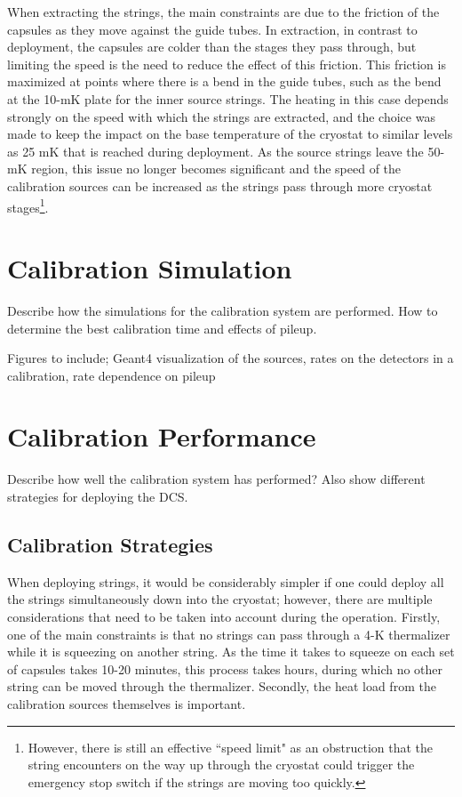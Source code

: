 When extracting the strings, the main constraints are due to the friction of the capsules as they move against the guide tubes.
In extraction, in contrast to deployment, the capsules are colder than the stages they pass through, but limiting the speed is the need to reduce the effect of this friction.
This friction is maximized at points where there is a bend in the guide tubes, such as the bend at the 10-mK plate for the inner source strings.
The heating in this case depends strongly on the speed with which the strings are extracted, and the choice was made to keep the impact on the base temperature of the cryostat to similar levels as 25 mK that is reached during deployment.
As the source strings leave the 50-mK region, this issue no longer becomes significant and the speed of the calibration sources can be increased as the strings pass through more cryostat stages\footnote{However, there is still an effective ``speed limit" as an obstruction that the string encounters on the way up through the cryostat could trigger the emergency stop switch if the strings are moving too quickly.}.

\section{Calibration Simulation}
Describe how the simulations for the calibration system are performed. How to determine the best calibration time and effects of pileup.

Figures to include; Geant4 visualization of the sources, rates on the detectors in a calibration, rate dependence on pileup 

\section{Calibration Performance}

Describe how well the calibration system has performed? Also show different strategies for deploying the DCS.

\subsection*{Calibration Strategies}
\label{ssec:Calibration Strategies}

When deploying strings, it would be considerably simpler if one could deploy all the strings simultaneously down into the cryostat; however, there are multiple considerations that need to be taken into account during the operation.
Firstly, one of the main constraints is that no strings can pass through a 4-K thermalizer while it is squeezing on another string.
As the time it takes to squeeze on each set of capsules takes 10-20 minutes, this process takes hours, during which no other string can be moved through the thermalizer.
Secondly, the heat load from the calibration sources themselves is important.
